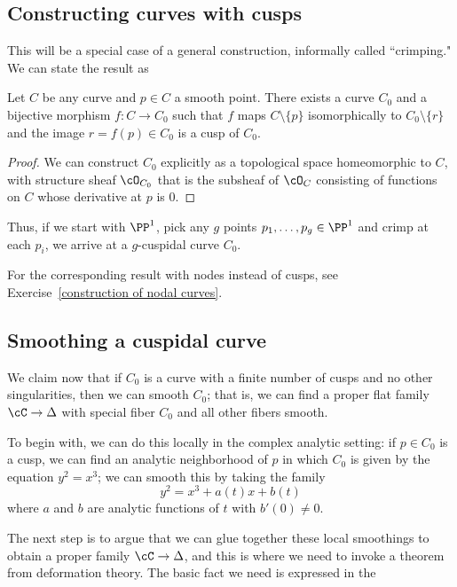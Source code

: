 \subsection{Constructing curves with cusps}

This will be a special case of a general construction, informally called ``crimping." We can state the result as

\begin{proposition}
Let $C$ be any curve and $p \in C$ a smooth point. There exists a curve $C_0$ and a bijective morphism $f : C \to C_0$ such that  $f$ maps $C \setminus \{p\}$ isomorphically to $C_0 \setminus \{r\}$ and the image $r=f(p) \in C_0$ is a cusp of $C_0$.
\end{proposition}


\begin{proof}
We can construct $C_0$ explicitly as a topological space homeomorphic to $C$, with structure sheaf $\cO_{C_0}$ that is
the subsheaf of $\cO_C$ consisting of functions on $C$ whose derivative at $p$ is 0.
\end{proof}

Thus, if we start with $\PP^1$, pick any $g$ points $p_1,\dots, p_g \in \PP^1$ and crimp at each $p_i$, we arrive at a $g$-cuspidal curve $C_0$.

For the corresponding result with nodes instead of cusps, see Exercise~\ref{construction of nodal curves}. 

\subsection{Smoothing a cuspidal curve}  We claim now that if $C_0$ is a curve with a finite number of cusps and no other singularities, then we can smooth $C_0$; that is, we can find a proper flat family $\cC \to \Delta$ with special fiber $C_0$ and all other fibers smooth. 

To begin with, we can do this locally in the complex analytic setting: if $p \in C_0$ is a cusp, we can find an analytic neighborhood of $p$ in which $C_0$ is given by the equation $y^2 = x^3$; we can smooth this by taking the family
$$
y^2 = x^3 + a(t)x + b(t)
$$
where $a$ and $b$ are analytic functions of $t$ with $b'(0) \neq 0$.

The next step is to argue that we can glue together these local smoothings to obtain a proper family $\cC \to \Delta$, and this is where we need to invoke a theorem from deformation theory. The basic fact we need is expressed in the

